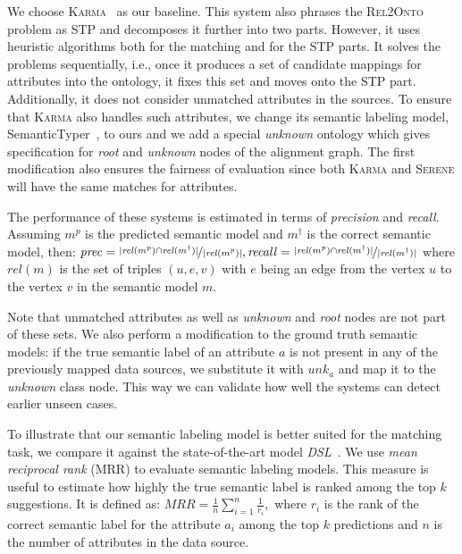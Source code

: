 \documentclass[letterpaper]{article} %
\newcommand{\authornote}[3]{
  {\fbox{\sc 
  #1}:$\blacktriangleright$\textcolor{#2}{\small{#3}}$\blacktriangleleft$}%
}
\newcommand{\npr}[1]{\authornote{NPR}{orange}{#1}}
\newcommand{\relonto}{\textsc{Rel2Onto}}
\newcommand{\karma}{\textsc{Karma}}
\newcommand{\serene}{\textsc{Serene}}
\newcommand{\ignore}[1]{}
\newcommand{\forijcai}[1]{}
\begin{document}
We choose \karma{}~\cite{taheriyan2016learning} as our baseline.
This system also phrases the \relonto{} problem as STP and decomposes it further into two parts.
However, it uses heuristic algorithms both for the matching and for the STP 
parts.
It solves the problems sequentially, i.e., once it produces a set of candidate 
mappings for attributes into the ontology, it fixes this set and moves
onto the STP part.
Additionally, it does not consider unmatched attributes in the sources.
To ensure that \karma{} also handles such attributes, we change its semantic 
labeling model, SemanticTyper~\cite{Ramnandan:Assigning}, to ours and we add a 
special \emph{unknown} ontology which gives specification for \emph{root} and 
\emph{unknown} nodes of the alignment graph.
The first modification also ensures the fairness of evaluation since both 
\karma{} and \serene{} will have the same matches for attributes.

The performance of these systems is estimated in terms of \emph{precision} and \emph{recall}.
Assuming $m^{p}$ is the predicted semantic model and $m^\dag$ is the correct semantic model, then:
$\mathit{prec} = \nicefrac{|\mathit{rel}(m^{p})\cap 
\mathit{rel}(m^\dag)|}{|\mathit{rel}(m^{p})|}, 
\mathit{recall} = \nicefrac{|\mathit{rel}(m^{p})\cap 
\mathit{rel}(m^\dag)|}{|\mathit{rel}(m^\dag)|}$
where $rel(m)$ is the set of triples $(u,e,v)$ with $e$ being an edge from the vertex $u$ to the vertex $v$ in the semantic model $m$.
\ignore{Since we want to estimate the accuracy of both the matching and STP 
parts,
we also include triples for attributes and data nodes into the corresponding 
sets.}
Note that unmatched attributes as well as \emph{unknown} and \emph{root} nodes are not part of these sets.
We also perform a modification to the ground truth semantic models:
if the true semantic label of an attribute $a$ is not present in any of the 
previously mapped data sources, we substitute it with $unk_a$ and map it to the 
\emph{unknown} class node.
This way we can validate how well the systems can detect earlier unseen cases.

To illustrate that our semantic labeling model is better suited for the
matching task, 
we compare it against the state-of-the-art model \emph{DSL}~\cite{Pham:semantic}.\forijcai{which was shown to perform 
even better than SemanticTyper.} 
We use \emph{mean reciprocal rank} (MRR) to evaluate semantic labeling models.
This measure is useful to estimate how highly the true semantic label is ranked among the top $k$ suggestions.
It is defined as:
$MRR = \frac{1}{n}\sum_{i=1}^{n}{\frac{1}{r_i}},$
where $r_i$ is the rank of the correct semantic label for the attribute $a_i$ among the top $k$ predictions and $n$ is the number of attributes in the data source.
\end{document}
